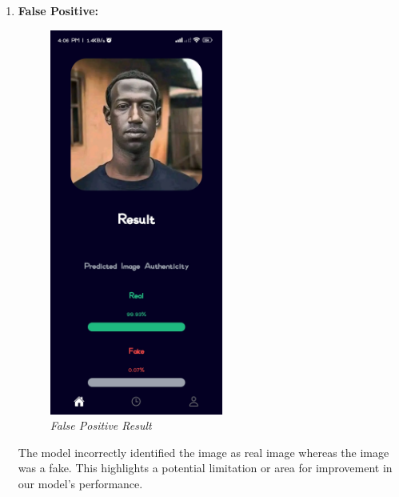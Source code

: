 \begin{enumerate}
          \newpage
    \item \textbf{False Positive:}
       \\
          \begin{figure}[ht]
              \centering
              \includegraphics[height =5in  ]{img/blckzukeOutput.jpg}
              \caption{\textit{False Positive Result}}
          \end{figure}
    
           The model incorrectly identified the image as real image whereas the image was a fake. This highlights a potential limitation or area for improvement in our model's performance.

          \newpage


\end{enumerate}
